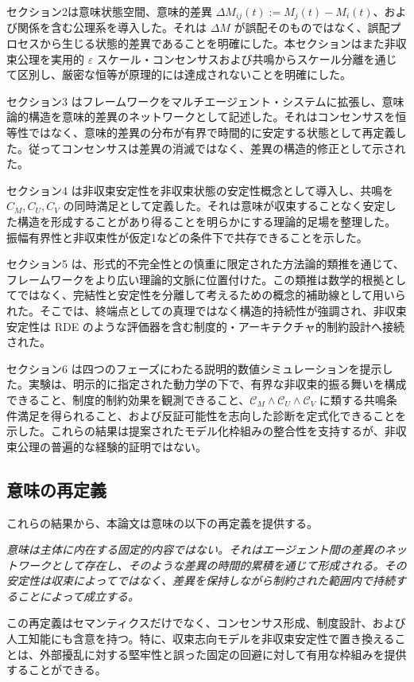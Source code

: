 \documentclass[11pt,a4paper]{article}
\theoremstyle{definition}
\begin{document}
セクション2は意味状態空間、意味的差異 $\Delta M_{ij}(t) := M_j(t) - M_i(t)$、および関係を含む公理系を導入した。それは $\Delta M$ が誤配そのものではなく、誤配プロセスから生じる状態的差異であることを明確にした。本セクションはまた非収束公理を実用的 $\varepsilon$ スケール・コンセンサスおよび共鳴からスケール分離を通じて区別し、厳密な恒等が原理的には達成されないことを明確にした。

セクション3 はフレームワークをマルチエージェント・システムに拡張し、意味論的構造を意味的差異のネットワークとして記述した。それはコンセンサスを恒等性ではなく、意味的差異の分布が有界で時間的に安定する状態として再定義した。従ってコンセンサスは差異の消滅ではなく、差異の構造的修正として示された。

セクション4 は非収束安定性を非収束状態の安定性概念として導入し、共鳴を $C_M, C_U, C_V$ の同時満足として定義した。それは意味が収束することなく安定した構造を形成することがあり得ることを明らかにする理論的足場を整理した。振幅有界性と非収束性が仮定1などの条件下で共存できることを示した。

セクション5 は、形式的不完全性との慎重に限定された方法論的類推を通じて、フレームワークをより広い理論的文脈に位置付けた。この類推は数学的根拠としてではなく、完結性と安定性を分離して考えるための概念的補助線として用いられた。そこでは、終端点としての真理ではなく構造的持続性が強調され、非収束安定性は RDE のような評価器を含む制度的・アーキテクチャ的制約設計へ接続された。

セクション6 は四つのフェーズにわたる説明的数値シミュレーションを提示した。実験は、明示的に指定された動力学の下で、有界な非収束的振る舞いを構成できること、制度的制約効果を観測できること、$\mathcal{C}_M \land \mathcal{C}_U \land \mathcal{C}_V$ に類する共鳴条件満足を得られること、および反証可能性を志向した診断を定式化できることを示した。これらの結果は提案されたモデル化枠組みの整合性を支持するが、非収束公理の普遍的な経験的証明ではない。

\subsection{意味の再定義}

これらの結果から、本論文は意味の以下の再定義を提供する。

\textit{意味は主体に内在する固定的内容ではない。それはエージェント間の差異のネットワークとして存在し、そのような差異の時間的累積を通じて形成される。その安定性は収束によってではなく、差異を保持しながら制約された範囲内で持続することによって成立する。}

この再定義はセマンティクスだけでなく、コンセンサス形成、制度設計、および人工知能にも含意を持つ。特に、収束志向モデルを非収束安定性で置き換えることは、外部擾乱に対する堅牢性と誤った固定の回避に対して有用な枠組みを提供することができる。
\end{document}
